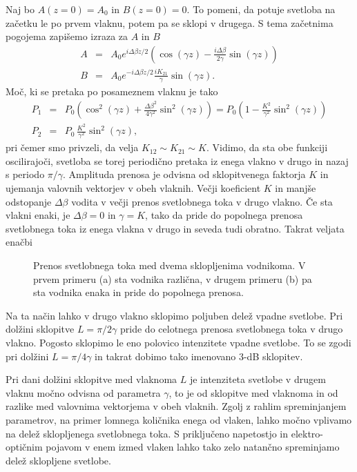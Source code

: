 Naj bo $A(z=0) = A_0$ in $B(z=0)=0$. To pomeni, da potuje svetloba na začetku
le po prvem vlaknu, potem pa se sklopi v drugega. S tema začetnima pogojema zapišemo izraza 
za $A$ in $B$
\begin{eqnarray}
A &=& A_0 e^{i \Delta \beta z/2} \left( \cos(\gamma z) - \frac{i \Delta \beta}{2 \gamma}\sin(\gamma z) \right)\\
B &= & A_0 e^{-i \Delta \beta z/2} \frac{i K_{21}}{\gamma}\sin(\gamma z).
\end{eqnarray}
Moč, ki se pretaka po posameznem vlaknu je tako
\begin{eqnarray}
P_1 &=& P_0 \left( \cos^2(\gamma z) + \frac{\Delta \beta^2}{4 \gamma^2}\sin^2(\gamma z) \right)
= P_0 \left( 1 - \frac{K^2}{\gamma^2}\sin^2(\gamma z) \right)\\
P_2 &= & P_0\, \frac{K^2}{\gamma^2}\sin^2(\gamma z),
\end{eqnarray}
pri čemer smo privzeli, da velja $K_{12} \sim K_{21} \sim K$. Vidimo, da sta obe funkciji oscilirajoči, 
svetloba se torej periodično pretaka iz enega vlakno v drugo in nazaj s periodo $\pi/\gamma$. 
Amplituda prenosa je 
odvisna od sklopitvenega faktorja $K$ in ujemanja valovnih vektorjev v obeh vlaknih. Večji koeficient $K$
in manjše odstopanje $\Delta \beta$ vodita v večji prenos svetlobnega toka v drugo vlakno. Če sta vlakni 
enaki, je $\Delta \beta = 0$ in $\gamma = K$, tako da pride do popolnega prenosa
svetlobnega toka iz enega vlakna v drugo in seveda tudi obratno.
Takrat veljata enačbi
\begin{figure}[h]
\centering
\def\svgwidth{140truemm} 
 
\caption{Prenos svetlobnega toka med dvema sklopljenima vodnikoma. V prvem primeru (a) sta
vodnika različna, v drugem primeru (b) pa sta vodnika enaka in pride do popolnega prenosa.}
\label{fig:foscil}
\end{figure}
Na ta način lahko v drugo vlakno sklopimo poljuben delež vpadne svetlobe. 
Pri dolžini sklopitve $L = \pi/2 \gamma$ pride do celotnega prenosa svetlobnega toka v drugo vlakno.
Pogosto sklopimo le eno polovico intenzitete vpadne svetlobe. To se zgodi pri dolžini $L = \pi/4 \gamma$
in takrat dobimo tako imenovano 3-dB sklopitev. 

\begin{remark}
 Pri dani dolžini sklopitve med vlaknoma $L$ je intenziteta svetlobe v drugem vlaknu močno odvisna od
 parametra $\gamma$, to je od sklopitve med vlaknoma in od razlike med valovnima vektorjema 
 v obeh vlaknih. Zgolj z rahlim spreminjanjem parametrov, na primer lomnega količnika enega od vlaken,
 lahko močno vplivamo na delež sklopljenega svetlobnega toka. S priključeno napetostjo in elektro-optičnim
 pojavom v enem izmed vlaken lahko tako zelo natančno spreminjamo delež sklopljene svetlobe. 
\end{remark}

